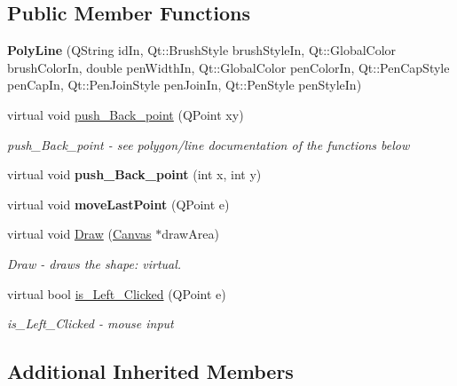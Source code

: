\subsection*{Public Member Functions}
\begin{DoxyCompactItemize}
\item 
\mbox{\label{class_poly_line_a5f896d603d3f1d495ba4cb647c771a96}} 
{\bfseries Poly\+Line} (Q\+String id\+In, Qt\+::\+Brush\+Style brush\+Style\+In, Qt\+::\+Global\+Color brush\+Color\+In, double pen\+Width\+In, Qt\+::\+Global\+Color pen\+Color\+In, Qt\+::\+Pen\+Cap\+Style pen\+Cap\+In, Qt\+::\+Pen\+Join\+Style pen\+Join\+In, Qt\+::\+Pen\+Style pen\+Style\+In)
\item 
virtual void \hyperlink{class_poly_line_afbc3a0e59abcd27bdb58027796e91c3a}{push\+\_\+\+Back\+\_\+point} (Q\+Point xy)
\begin{DoxyCompactList}\small\item\em push\+\_\+\+Back\+\_\+point -\/ see polygon/line documentation of the functions below \end{DoxyCompactList}\item 
\mbox{\label{class_poly_line_a3a2483c862ffa1f31157d7fd510dca6c}} 
virtual void {\bfseries push\+\_\+\+Back\+\_\+point} (int x, int y)
\item 
\mbox{\label{class_poly_line_a73a4db1130cb26bba52e750ae27e7fd8}} 
virtual void {\bfseries move\+Last\+Point} (Q\+Point e)
\item 
virtual void \hyperlink{class_poly_line_ac42ca364849f33b899a929bf57163730}{Draw} (\hyperlink{class_canvas}{Canvas} $\ast$draw\+Area)
\begin{DoxyCompactList}\small\item\em Draw -\/ draws the shape\+: virtual. \end{DoxyCompactList}\item 
virtual bool \hyperlink{class_poly_line_a349f5b14d3ab568ae6776a3d5fd6f956}{is\+\_\+\+Left\+\_\+\+Clicked} (Q\+Point e)
\begin{DoxyCompactList}\small\item\em is\+\_\+\+Left\+\_\+\+Clicked -\/ mouse input \end{DoxyCompactList}\end{DoxyCompactItemize}
\subsection*{Additional Inherited Members}


